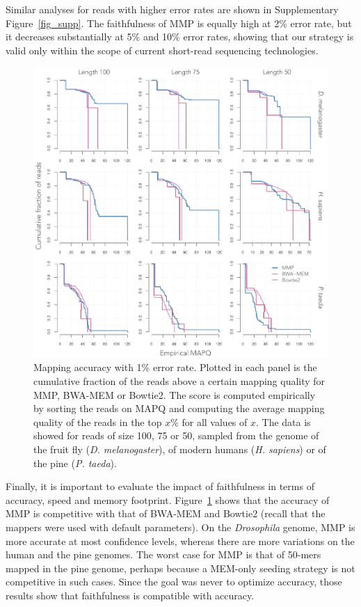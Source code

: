 \documentclass[a4,center,fleqn]{NAR}
\begin{document}
Similar analyses for reads with higher error rates are shown in
Supplementary Figure~\ref{fig_supp}. The faithfulness of MMP is equally
high at 2\% error rate, but it decreases substantially at 5\% and 10\%
error rates, showing that our strategy is valid only within the scope of
current short-read sequencing technologies.

\begin{figure}[t]
\begin{center}
\includegraphics[scale=.54]{fig_acc.pdf}
\end{center}
\caption{Mapping accuracy with 1\% error rate. Plotted in each panel is
the cumulative fraction of the reads above a certain mapping quality for
MMP, BWA-MEM or Bowtie2. The score is computed empirically by sorting the
reads on MAPQ and computing the average mapping quality of the reads in
the top $x$\% for all values of $x$. The data is showed for reads of size
100, 75 or 50, sampled from the genome of the fruit fly (\textit{D.
melanogaster}), of modern humans (\textit{H. sapiens}) or of the pine
(\textit{P. taeda}).}
\label{fig_acc}
\end{figure}


Finally, it is important to evaluate the impact of faithfulness in terms
of accuracy, speed and memory footprint. Figure~\ref{fig_acc} shows that
the accuracy of MMP is competitive with that of BWA-MEM and Bowtie2
(recall that the mappers were used with default parameters). On the
\textit{Drosophila} genome, MMP is more accurate at most confidence
levels, whereas there are more variations on the human and the pine
genomes. The worst case for MMP is that of 50-mers mapped in the pine
genome, perhaps because a MEM-only seeding strategy is not competitive in
such cases. Since the goal was never to optimize accuracy, those results
show that faithfulness is compatible with accuracy.
\end{document}
